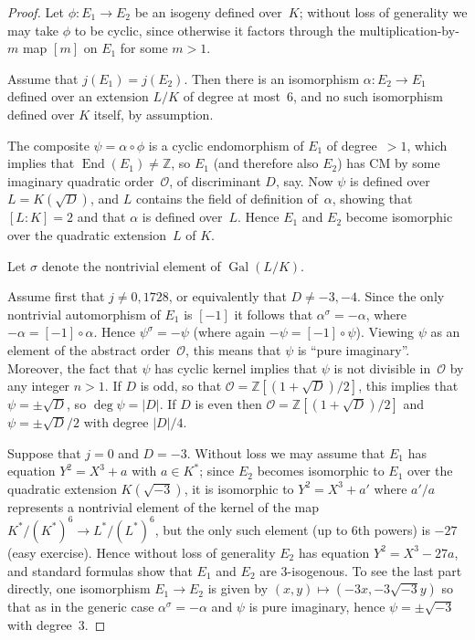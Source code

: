 \documentclass{article}
\theoremstyle{remark}
\def\Z{{\mathbb Z}}
\def\OO{{\mathcal O}}
\DeclareMathOperator{\Gal}{Gal}
\DeclareMathOperator{\End}{End}
\begin{document}
\begin{proof}
Let $\phi:E_1\to E_2$ be an isogeny defined over~$K$; without loss of
generality we may take $\phi$ to be cyclic, since otherwise it factors
through the multiplication-by-$m$ map $[m]$ on $E_1$ for some $m>1$.

Assume that $j(E_1)=j(E_2)$.  Then there is an isomorphism
$\alpha:E_2\to E_1$ defined over an extension $L/K$ of degree at
most~$6$, and no such isomorphism defined over $K$ itself, by
assumption.

The composite $\psi=\alpha\circ\phi$ is a cyclic endomorphism of $E_1$
of degree~${}>1$, which implies that $\End(E_1)\ne \Z$, so $E_1$ (and
therefore also $E_2$) has CM by some imaginary quadratic order~$\OO$, of
discriminant $D$, say.  Now $\psi$ is defined over $L=K(\sqrt{D})$,
and $L$ contains the field of definition of~$\alpha$, showing that
$[L:K]=2$ and that $\alpha$ is defined over~$L$.  Hence $E_1$ and
$E_2$ become isomorphic over the quadratic extension~$L$ of $K$.

Let $\sigma$ denote the nontrivial element of $\Gal(L/K)$.

Assume first that $j\not=0, 1728$, or equivalently that $D\not=-3,-4$.
Since the only nontrivial automorphism of $E_1$ is $[-1]$ it follows
that $\alpha^{\sigma}=-\alpha$, where $-\alpha=[-1]\circ\alpha$. Hence
$\psi^{\sigma}=-\psi$ (where again $-\psi=[-1]\circ\psi$).  Viewing
$\psi$ as an element of the abstract order~$\OO$, this means that
$\psi$ is ``pure imaginary''.  Moreover, the fact that $\psi$ has
cyclic kernel implies that $\psi$ is not divisible in~$\OO$ by any
integer $n>1$.  If $D$ is odd, so that $\OO=\Z[(1+\sqrt{D})/2]$, this
implies that $\psi=\pm\sqrt{D}$, so $\deg\psi=|D|$.  If $D$ is even
then $\OO=\Z[(1+\sqrt{D})/2]$ and $\psi=\pm\sqrt{D}/2$ with degree
$|D|/4$.

Suppose that $j=0$ and $D=-3$.  Without loss we may assume that $E_1$
has equation $Y^2=X^3+a$ with $a\in K^*$; since $E_2$ becomes
isomorphic to $E_1$ over the quadratic extension $K(\sqrt{-3})$, it is
isomorphic to $Y^2=X^3+a'$ where $a'/a$ represents a nontrivial
element of the kernel of the map $K^*/(K^*)^6 \to L^*/(L^*)^6$, but
the only such element (up to 6th powers) is $-27$ (easy exercise).
Hence without loss of generality $E_2$ has equation $Y^2=X^3-27a$, and
standard formulas show that $E_1$ and $E_2$ are $3$-isogenous.  To see
the last part directly, one isomorphism $E_1\to E_2$ is given by
$(x,y)\mapsto(-3x,-3\sqrt{-3}y)$ so that as in the generic case
$\alpha^{\sigma}=-\alpha$ and $\psi$ is pure imaginary, hence
$\psi=\pm\sqrt{-3}$ with degree~$3$.


\end{proof}
\end{document}
